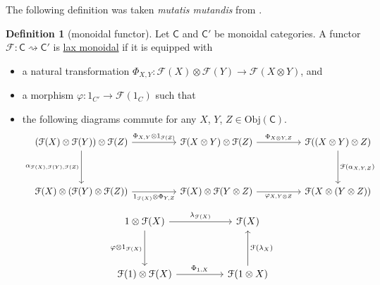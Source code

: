 \documentclass[a4paper]{report}
\newcommand{\defn}[1]{\ul{#1}}
\newcommand{\Obj}{\mathrm{Obj}}
\theoremstyle{definition}
\newtheorem{definition}{Definition}[section]
\theoremstyle{plain}
\theoremstyle{remark}
\begin{document}
The following definition was taken \emph{mutatis mutandis} from \cite{baez-definitions-everyone-should-know}. 
\begin{definition}[monoidal functor]
  \label{def:monoidalfunctor}
  Let $\mathsf{C}$ and $\mathsf{C}'$ be monoidal categories. A functor $\mathcal{F}\colon \mathsf{C} \rightsquigarrow \mathsf{C}'$ is \defn{lax monoidal} if it is equipped with
  \begin{itemize}
    \item a natural transformation $\Phi_{X, Y}\colon \mathcal{F}(X) \otimes \mathcal{F}(Y) \to \mathcal{F}(X \otimes Y)$, and

    \item a morphism $\varphi\colon 1_{C'} \to \mathcal{F}(1_{C})$ such that

    \item the following diagrams commute for any $X$, $Y$, $Z \in \Obj(\mathsf{C})$.
      \begin{equation*}
        \begin{tikzcd}[row sep=huge, column sep=huge]
          (\mathcal{F}(X) \otimes \mathcal{F}(Y)) \otimes \mathcal{F}(Z)
          \arrow[r, "{\Phi_{X, Y} \otimes 1_{\mathcal{F}(Z)}}"]
          \arrow[d, swap, "\alpha_{\mathcal{F}(X), \mathcal{F}(Y), \mathcal{F}(Z)}"]
          & \mathcal{F}(X \otimes Y) \otimes \mathcal{F}(Z)
          \arrow[r, "{\Phi_{X \otimes Y, Z}}"]
          & \mathcal{F}((X \otimes Y) \otimes Z) 
          \arrow[d, "{\mathcal{F}(\alpha_{X, Y, Z})}"]
          \\
          \mathcal{F}(X) \otimes (\mathcal{F}(Y) \otimes \mathcal{F}(Z)) 
          \arrow[r, swap, "{1_{\mathcal{F}(X)} \otimes \Phi_{Y, Z}}"]
          & \mathcal{F}(X) \otimes \mathcal{F}(Y \otimes Z)
          \arrow[r, swap, "{\varphi_{X, Y \otimes Z}}"]
          & \mathcal{F}(X \otimes (Y \otimes Z))
        \end{tikzcd}
      \end{equation*}
      \begin{equation*}
        \begin{tikzcd}[row sep=huge, column sep=huge]
          1 \otimes \mathcal{F}(X)
          \arrow[r, "\lambda_{\mathcal{F}(X)}"]
          \arrow[d, swap, "\varphi \otimes 1_{\mathcal{F}(X)}"]
          & \mathcal{F}(X) 
          \\
          \mathcal{F}(1) \otimes \mathcal{F}(X)
          \arrow[r, "{\Phi_{1, X}}"]
          & \mathcal{F}(1 \otimes X)
          \arrow[u, swap, "\mathcal{F}(\lambda_{X})"]
        \end{tikzcd}

\end{equation*}
\end{itemize}
\end{definition}
\end{document}

